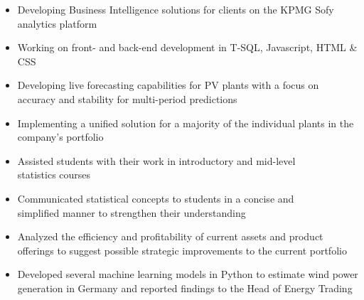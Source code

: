 \documentclass[9pt,a4paper,ragged2e]{altacv}
\begin{document}

    \begin{itemize}
        \item Developing Business Intelligence solutions for clients on the KPMG Sofy analytics platform
        \item Working on front- and back-end development in T-SQL, Javascript, HTML \& CSS
    \end{itemize}

    \divider

    \begin{itemize}
        \item Developing live forecasting capabilities for PV plants with a focus on accuracy and stability for multi-period predictions
        \item Implementing a unified solution for a majority of the individual plants in the company's portfolio
    \end{itemize}

    \divider

    \begin{itemize}
        \item Assisted students with their work in introductory and mid-level \\ statistics courses
        \item Communicated statistical concepts to students in a concise and \\ simplified manner to strengthen their understanding
    \end{itemize}

    \divider

    \begin{itemize}
        \item Analyzed the efficiency and profitability of current assets and product offerings to suggest possible strategic improvements to the current portfolio
        \item Developed several machine learning models in Python to estimate wind power generation in Germany and reported findings to the Head of Energy Trading
    \end{itemize}
\end{document}
